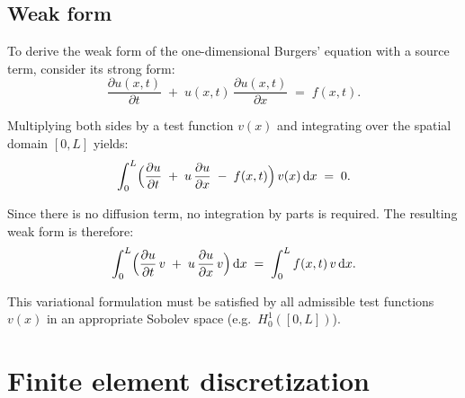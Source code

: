 \subsection{Weak form}

To derive the weak form of the one-dimensional Burgers' equation with a source term, consider its strong form:
\begin{equation}
\frac{\partial u(x,t)}{\partial t} 
\;+\;
u(x,t) \,\frac{\partial u(x,t)}{\partial x}
\;=\;
f(x,t).
\end{equation}

Multiplying both sides by a test function \(v(x)\) and integrating over the spatial domain \([0, L]\) yields:
\begin{equation}
\int_0^L 
\Bigl(
\frac{\partial u}{\partial t}
\;+\;
u\,\frac{\partial u}{\partial x}
\;-\;
f(x,t)
\Bigr) 
\,v(x)\,\mathrm{d}x 
\;=\; 
0.
\end{equation}

Since there is no diffusion term, no integration by parts is required. The resulting weak form is therefore:
\begin{equation}
\int_0^L 
\Bigl(
\frac{\partial u}{\partial t}\,v
\;+\;
u\,\frac{\partial u}{\partial x}\,v
\Bigr)\,\mathrm{d}x
\;=\;
\int_0^L 
f(x,t)\,v\,\mathrm{d}x.
\end{equation}

This variational formulation must be satisfied by all admissible test functions \(v(x)\) in an appropriate Sobolev space (e.g.\ \(H_0^1([0,L])\)).


\section{Finite element discretization}
\label{sec:fem_discretization}

